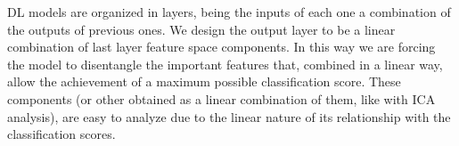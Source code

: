 




DL models are organized in layers, being the inputs of each one a combination of the outputs of previous ones. We design the output layer to be a linear combination of last layer feature space components. In this way we are forcing the model to disentangle the important features that, combined in a linear way, allow the achievement of a maximum possible classification score. These components (or other obtained as a linear combination of them, like with ICA analysis), are easy to analyze due to the linear nature of its relationship with the classification scores.

